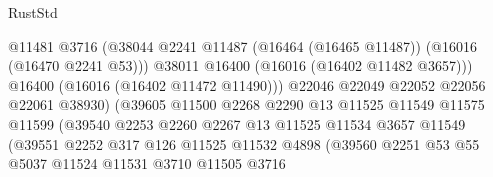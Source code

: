 \begin{lexlean}{RustStd}
\begin{coremodule}
                                          @11481
                                          @3716
                                          (@38044
                                            @2241
                                            @11487
                                            (@16464 (@16465 @11487))
                                            (@16016 (@16470 @2241 @53)))
                                          @38011
                                          @16400
                                          (@16016 (@16402 @11482 @3657)))
                                        @16400
                                        (@16016 (@16402 @11472 @11490)))
                                      @22046
                                      @22049
                                      @22052
                                      @22056
                                      @22061
                                      @38930)
                                    (@39605
                                      @11500
                                      @2268
                                      @2290
                                      @13
                                      @11525
                                      @11549
                                      @11575
                                      @11599
                                      (@39540
                                        @2253
                                        @2260
                                        @2267
                                        @13
                                        @11525
                                        @11534
                                        @3657
                                        @11549
                                        (@39551
                                          @2252
                                          @317
                                          @126
                                          @11525
                                          @11532
                                          @4898
                                          (@39560
                                            @2251
                                            @53
                                            @55
                                            @5037
                                            @11524
                                            @11531
                                            @3710
                                            @11505
                                            @3716

\end{coremodule}
\end{lexlean}
